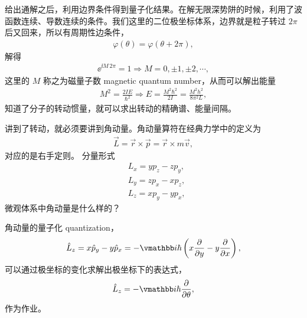 给出通解之后，利用边界条件得到量子化结果。在解无限深势阱的时候，利用了波函数连续、导数连续的条件。我们这里的二位极坐标体系，边界就是粒子转过 $2\pi$ 后又回来，所以有周期性边条件，
\begin{align}
    \varphi(\theta) = \varphi(\theta + 2\pi),
\end{align}
解得
\begin{align}
    \ee^{\ii M\, 2\pi} = 1 \Rightarrow M = 0, \pm 1, \pm 2, \cdots,
\end{align}
这里的 $M$ 称之为磁量子数 magnetic quantum number，从而可以解出能量
\begin{align}
    M^2 = \frac{2IE}{\hbar^2} \Rightarrow E = \frac{M^2\hbar^2} {2I} = \frac{M^2h^2} {8\pi^2 L},
\end{align}
知道了分子的转动惯量，就可以求出转动的精确谱、能量间隔。


讲到了转动，就必须要讲到角动量。角动量算符在经典力学中的定义为
\begin{align}
    \vec L = \vec r \times \vec p = \vec r \times m\vec v, 
\end{align}
对应的是右手定则。
分量形式
\begin{align}
    &L_x = y p_z - zp_y, \\
    &L_y = z p_x - x p_z, \\
    &L_z = x p_y - y p_x, 
\end{align}
微观体系中角动量是什么样的？

角动量的量子化 quantization，
\begin{align}
    \hat L_z = x \hat p_y - y \hat p_x = - \ii \hbar \left(x \pdv{y} - y \pdv{x}\right),
\end{align}
可以通过极坐标的变化求解出极坐标下的表达式，
\begin{align}
    \hat L_z = -\ii \hbar \pdv{\theta},
\end{align}
作为作业。

